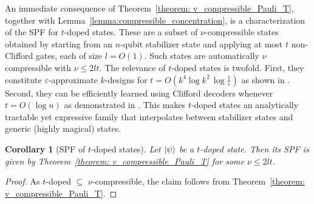 \documentclass[aps,pra,superscriptaddress,twocolumn,longbibliography]{revtex4-2}
\newtheorem{corollary}{Corollary}
\begin{document}
An immediate consequence of Theorem~\ref{theorem: v_compressible_Pauli_T}, together with Lemma~\ref{lemma:compressible_concentration}, is a characterization of the SPF for $t$-doped states. These are a subset of
$\nu$-compressible states obtained by starting from an $n$-qubit stabilizer state and applying at most $t$ non-Clifford gates, each of size
$l = O(1)$. Such states are automatically $\nu$ compressible with $\nu \le 2lt$. The relevance of $t$-doped states is twofold. First, they constitute
$\varepsilon$-approximate $k$-designs for $t = O\!\left(k^{4}\log k^{2}\,\log \frac{1}{\varepsilon}\right)$ as shown in \cite{Haferkamp/arbitrary_k_designs/2022}.
Second, they can be efficiently learned using Clifford decoders whenever $ t = O(\log n)$ as demonstrated in \cite{Leone/Clifford_decoders_PRA/2024,Oliviero/Clifford_Decoders_letter/2024}. This makes $t$-doped states an analytically tractable yet expressive family
that interpolates between stabilizer states and generic (highly magical) states.

\begin{corollary}[SPF of $t$-doped states]
Let $\ket{\psi}$ be a $t$-doped state. Then its SPF is given by Theorem~\ref{theorem: v_compressible_Pauli_T} for some $\nu \leq 2lt$.
\end{corollary}
\begin{proof}
    As $t$-doped $\subseteq$ $\nu$-compressible, the claim follows from Theorem~\ref{theorem: v_compressible_Pauli_T}.
\end{proof}
\end{document}

